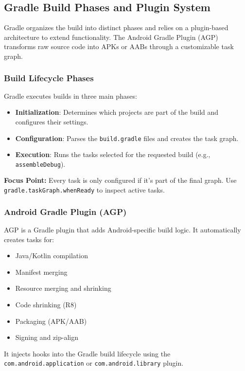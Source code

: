 \documentclass[a4paper,12pt]{article}
\begin{document}
\subsection{Gradle Build Phases and Plugin System}

Gradle organizes the build into distinct phases and relies on a plugin-based architecture to extend functionality. The Android Gradle Plugin (AGP) transforms raw source code into APKs or AABs through a customizable task graph.

\subsubsection{Build Lifecycle Phases}

Gradle executes builds in three main phases:

\begin{itemize}
  \item \textbf{Initialization}: Determines which projects are part of the build and configures their settings.
  \item \textbf{Configuration}: Parses the \texttt{build.gradle} files and creates the task graph.
  \item \textbf{Execution}: Runs the tasks selected for the requested build (e.g., \texttt{assembleDebug}).
\end{itemize}

\textbf{Focus Point:} Every task is only configured if it’s part of the final graph. Use \texttt{gradle.taskGraph.whenReady} to inspect active tasks.

\subsubsection{Android Gradle Plugin (AGP)}

AGP is a Gradle plugin that adds Android-specific build logic. It automatically creates tasks for:

\begin{itemize}
  \item Java/Kotlin compilation
  \item Manifest merging
  \item Resource merging and shrinking
  \item Code shrinking (R8)
  \item Packaging (APK/AAB)
  \item Signing and zip-align
\end{itemize}

It injects hooks into the Gradle build lifecycle using the \texttt{com.android.application} or \texttt{com.android.library} plugin.
\end{document}
